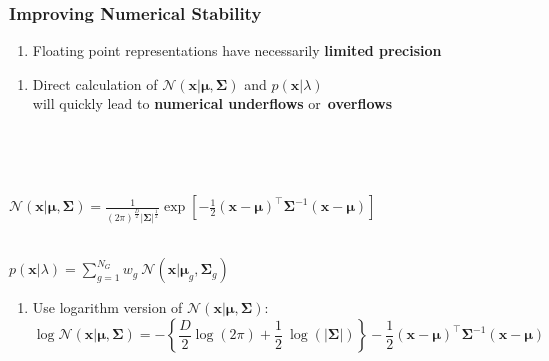 \documentclass[usenames,dvipsnames]{beamer}
\def\Vec#1{{\boldsymbol{#1}}}
\def\Mat#1{{\boldsymbol{#1}}}
\begin{document}
%
%
%

\begin{frame}
\frametitle{Improving Numerical Stability}

\begin{enumerate}[{~~$\boldsymbol{\bullet}$}]

\item Floating point representations have necessarily {\bf limited precision}

\end{enumerate}

\begin{minipage}{1\textwidth}
\begin{minipage}{0.5\textwidth}
\begin{enumerate}[{~~$\boldsymbol{\bullet}$}]
\item Direct calculation of ${{\mathcal{N}}}( \Vec{x} | \Vec{\mu}, \Mat{\Sigma} )$ and $p(\Vec{x} | \lambda)$\\
will quickly lead to {\bf numerical underflows} or~{\bf overflows}
\end{enumerate}
\end{minipage}
\vline~
\begin{minipage}{0.45\textwidth}
~\\
\begin{tiny}
${{\mathcal{N}}}( \Vec{x} | \Vec{\mu}, \Mat{\Sigma} ) = \frac{1}{ (2\pi)^{\frac{D}{2}} | \Mat{\Sigma}|^{\frac{1}{2}} } \exp \left[ -\frac{1}{2} (\Vec{x}-\Vec{\mu})^\top \Mat{\Sigma}^{-1} (\Vec{x}-\Vec{\mu}) \right]$\\
\end{tiny}
~\\
$p(\Vec{x} | \lambda) = \sum\nolimits_{g=1}^{N_G} w_g ~ {{\mathcal{N}}}( \Vec{x} | \Vec{\mu}_g, \Mat{\Sigma}_g )$\\
\end{minipage}

\end{minipage}

\begin{enumerate}[{~~$\boldsymbol{\bullet}$}]

\item Use logarithm version of ${{\mathcal{N}}}( \Vec{x} | \Vec{\mu}, \Mat{\Sigma} )$:
%
\begin{equation*}
  \log {{\mathcal{N}}}( \Vec{x} | \Vec{\mu}, \Mat{\Sigma} )
  = -\left\{\frac{D}{2} \log \left( 2\pi \right) + \frac{1}{2} ~ \log ( |\Mat{\Sigma}| ) \right\}
    -\frac{1}{2} (\Vec{x}-\Vec{\mu})^\top \Mat{\Sigma}^{-1} (\Vec{x}-\Vec{\mu})
\end{equation*}


\end{enumerate}
\end{frame}
\end{document}
